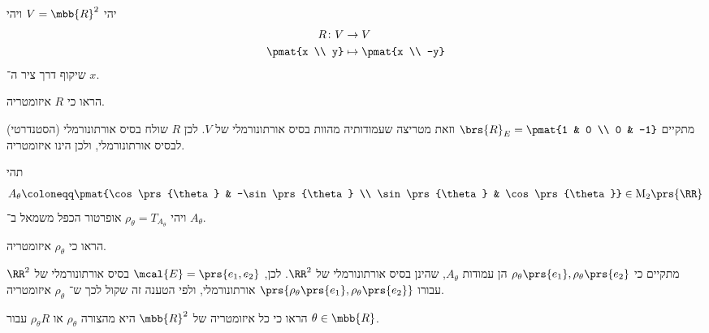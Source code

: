 \documentclass[a4paper,10pt,twoside,openany]{book}
\renewcommand{\Mat}{\mathrm{M}}
\begin{document}
\begin{exercisechap}
יהי
$V = \mbb{R}^2$
ויהי
\begin{align*}
    R \colon V &\to V \\
    \pmat{x \\ y} &\mapsto \pmat{x \\ -y}
\end{align*}
שיקוף דרך ציר ה־%
$x$.

הראו כי
$R$
איזומטריה.
\end{exercisechap}

\begin{solution}
מתקיים
$\brs{R}_E = \pmat{1 & 0 \\ 0 & -1}$
וזאת מטריצה שעמודותיה מהוות בסיס אורתונורמלי של
$V$.
לכן
$R$
שולח בסיס אורתונורמלי (הסטנדרטי) לבסיס אורתונורמלי, ולכן הינו איזומטריה.
\end{solution}

\begin{exercisechap}
תהי
\begin{align*}
A_\theta \coloneqq \pmat{\cos\prs{\theta} & -\sin\prs{\theta} \\ \sin\prs{\theta} & \cos\prs{\theta}} \in \Mat_2\prs{\RR}
\end{align*}
ויהי
$\rho_\theta = T_{A_\theta}$
אופרטור הכפל משמאל ב־%
$A_\theta$.

הראו כי
$\rho_\theta$
איזומטריה.
\end{exercisechap}

\begin{solution}
מתקיים כי
$\rho_\theta\prs{e_1}, \rho_\theta\prs{e_2}$
הן עמודות
$A_\theta$,
שהינן בסיס אורתונורמלי של
$\RR^2$.
לכן,
$\mcal{E} = \prs{e_1, e_2}$
בסיס אורתונורמלי של
$\RR^2$
עבורו
$\prs{\rho_\theta\prs{e_1}, \rho_\theta\prs{e_2}}$
אורתונורמלי, ולפי הטענה זה שקול לכך ש־%
$\rho_\theta$
איזומטריה.
\end{solution}

\begin{exercisechap}
הראו כי כל איזומטריה של
$\mbb{R}^2$
היא מהצורה
$\rho_\theta$
או
$\rho_\theta R$
עבור
$\theta \in \mbb{R}$.
\end{exercisechap}
\end{document}
